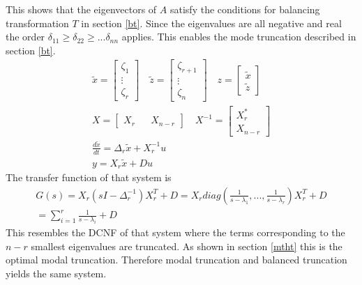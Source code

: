 This shows that the eigenvectors of \(A\) satisfy the conditions for balancing transformation \(T\) in section \ref{bt}.
Since the eigenvalues are all negative and real the order \(\delta_{11} \geq \delta_{22} \geq ...  \delta_{nn}\) applies.
This enables the mode truncation described in section \ref{bt}.
\begin{gather}
\tilde{x} = \begin{bmatrix}
\zeta_1 \\
\vdots \\
\zeta_r
\end{bmatrix} \quad 
\tilde{z} = \begin{bmatrix}
\zeta_{r+1} \\
\vdots \\
\zeta_n
\end{bmatrix} \quad
z = \begin{bmatrix}
\tilde{x} \\
\tilde{z}
\end{bmatrix}\\
X= \begin{bmatrix}
X_r && X_{n-r}
\end{bmatrix} \quad
X^{-1} = \begin{bmatrix}
X_r^{*} \\
X_{n-r}
\end{bmatrix} \\
\frac{d\tilde{x}}{dt} = \Delta_r \tilde{x} + X^{-1}_ru \\
y = X_r\tilde{x} + Du 
\end{gather}
The transfer function of that system is
\begin{gather}
G(s) = X_r(sI - \Delta_r^{-1})X_r^{T}+D = X_r diag(\frac{1}{s-\lambda_1}, ..., \frac{1}{s-\lambda_r})X_r^{T}+D \\
= \sum_{i=1}^{r} \frac{1}{s-\lambda_i} + D
\end{gather}
This resembles the DCNF of that system where the terms corresponding to the \(n-r\) smallest eigenvalues are truncated.
As shown in section \ref{mtht} this is the optimal modal truncation.
Therefore modal truncation and balanced truncation yields the same system.






